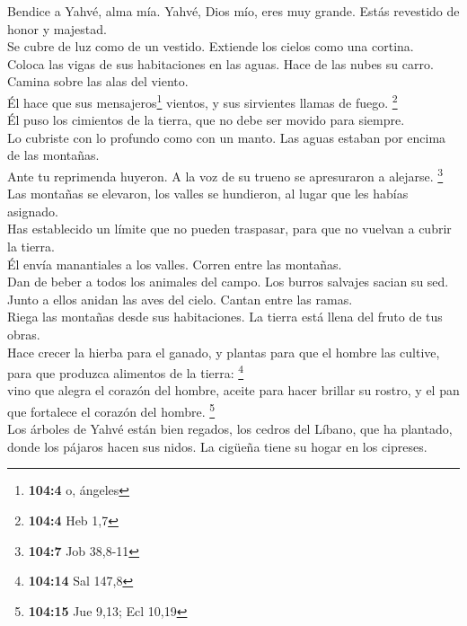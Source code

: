  Bendice a Yahvé, alma mía. Yahvé, Dios mío, eres muy
grande. Estás revestido de honor y majestad.\\
 Se cubre de luz como de un vestido. Extiende los cielos
como una cortina.\\
 Coloca las vigas de sus habitaciones en las aguas. Hace
de las nubes su carro. Camina sobre las alas del viento.\\
 Él hace que sus mensajeros\footnote{\textbf{104:4} o,
  ángeles} vientos, y sus sirvientes llamas de fuego. \footnote{\textbf{104:4}
  Heb 1,7}\\
 Él puso los cimientos de la tierra, que no debe ser
movido para siempre.\\
 Lo cubriste con lo profundo como con un manto. Las aguas
estaban por encima de las montañas.\\
 Ante tu reprimenda huyeron. A la voz de su trueno se
apresuraron a alejarse. \footnote{\textbf{104:7} Job 38,8-11}\\
 Las montañas se elevaron, los valles se hundieron, al
lugar que les habías asignado.\\
 Has establecido un límite que no pueden traspasar, para
que no vuelvan a cubrir la tierra.\\
 Él envía manantiales a los valles. Corren entre las
montañas.\\
 Dan de beber a todos los animales del campo. Los burros
salvajes sacian su sed.\\
 Junto a ellos anidan las aves del cielo. Cantan entre
las ramas.\\
 Riega las montañas desde sus habitaciones. La tierra
está llena del fruto de tus obras.\\
 Hace crecer la hierba para el ganado, y plantas para que
el hombre las cultive, para que produzca alimentos de la tierra:
\footnote{\textbf{104:14} Sal 147,8}\\
 vino que alegra el corazón del hombre, aceite para hacer
brillar su rostro, y el pan que fortalece el corazón del hombre.
\footnote{\textbf{104:15} Jue 9,13; Ecl 10,19}\\
 Los árboles de Yahvé están bien regados, los cedros del
Líbano, que ha plantado,\\
 donde los pájaros hacen sus nidos. La cigüeña tiene su
hogar en los cipreses.\\
